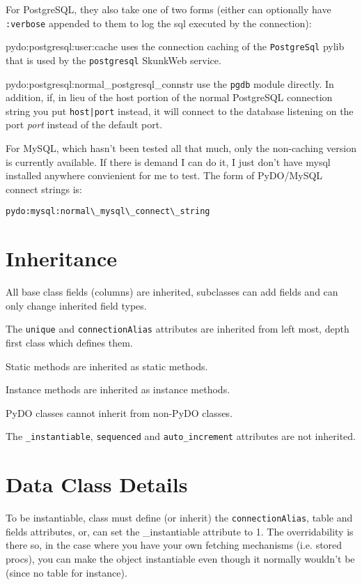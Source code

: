 \documentclass[titlepage]{manual}
\begin{document}
For PostgreSQL, they also take one of two forms (either can optionally
have \texttt{:verbose} appended to them to log the sql executed by the
connection): 
\begin{argdesc}
\item[pydo:postgresql:user:cache] uses the connection caching of the
\texttt{PostgreSql} pylib that is used by the \texttt{postgresql}
SkunkWeb service.
\item[pydo:postgresql:normal\_postgresql\_connstr] use the
\texttt{pgdb} module directly.  In addition, if, in lieu of the host
portion of the normal PostgreSQL connection string you put
\texttt{host|port} instead, it will connect to the database listening
on the port \emph{port} instead of the default port.
\end{argdesc}

For MySQL, which hasn't been tested all that much, only the non-caching
version is currently available.  If there is demand I can do it, I just
don't have mysql installed anywhere convienient for me to test.
The form of PyDO/MySQL connect strings is:
\begin{verbatim}
pydo:mysql:normal\_mysql\_connect\_string
\end{verbatim}

\section{Inheritance}
All base class fields (columns) are inherited, subclasses can add fields 
and can only change inherited field types.

The \texttt{unique} and \texttt{connectionAlias} attributes are
inherited from left most, depth first class which defines them.

Static methods are inherited as static methods.

Instance methods are inherited as instance methods.

PyDO classes cannot inherit from non-PyDO classes.

The \texttt{_instantiable}, \texttt{sequenced} and
\texttt{auto_increment} attributes are not inherited.



\section{Data Class Details}
To be instantiable, class must define (or inherit) the
\texttt{connectionAlias}, table and fields attributes, or, can set the
_instantiable attribute to 1.  The overridability is there so, in the
case where you have your own fetching mechanisms (i.e. stored procs),
you can make the object instantiable even though it normally wouldn't
be (since no table for instance).
\end{document}
